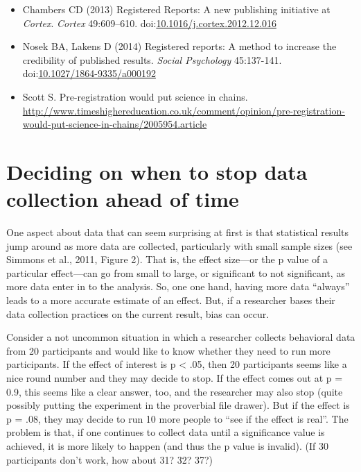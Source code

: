 \documentclass[letterpaper,oneside,11pt,article, portrait]{memoir}
\newcommand{\doi}[1]{doi:\href{http://dx.doi.org/#1}{#1}}
\newcommand{\journal}[1]{\textit{#1}} 			%
\begin{document}
\begin{itemize}
\item Chambers CD (2013) Registered Reports: A new publishing initiative at {\itshape Cortex}. \journal{Cortex} 49:609--610. \doi{10.1016/j.cortex.2012.12.016}

\item Nosek BA, Lakens D (2014) Registered reports: A method to increase the credibility of published results. \journal{Social Psychology} 45:137-141. \doi{10.1027/1864-9335/a000192}

\item Scott S. Pre-registration would put science in chains. \url{http://www.timeshighereducation.co.uk/comment/opinion/pre-registration-would-put-science-in-chains/2005954.article}

\end{itemize}


\chapter{Deciding on when to stop data collection ahead of time} \label{stoppingRule}

One aspect about data that can seem surprising at first is that statistical results jump around as more data are collected, particularly with small sample sizes (see Simmons et al., 2011, Figure 2). That is, the effect size---or the p value of a particular effect---can go from small to large, or significant to not significant, as more data enter in to the analysis. So, one one hand, having more data ``always'' leads to a more accurate estimate of an effect. But, if a researcher bases their data collection practices on the current result, bias can occur.

Consider a not uncommon situation in which a researcher collects behavioral data from 20 participants and would like to know whether they need to run more participants. If the effect of interest is p < .05, then 20 participants seems like a nice round number and they may decide to stop. If the effect comes out at p = 0.9, this seems like a clear answer, too, and the researcher may also stop (quite possibly putting the experiment in the proverbial file drawer). But if the effect is p = .08, they may decide to run 10 more people to ``see if the effect is real''. The problem is that, if one continues to collect data until a significance value is achieved, it is more likely to happen (and thus the p value is invalid). (If 30 participants don't work, how about 31? 32? 37?)
\end{document}
